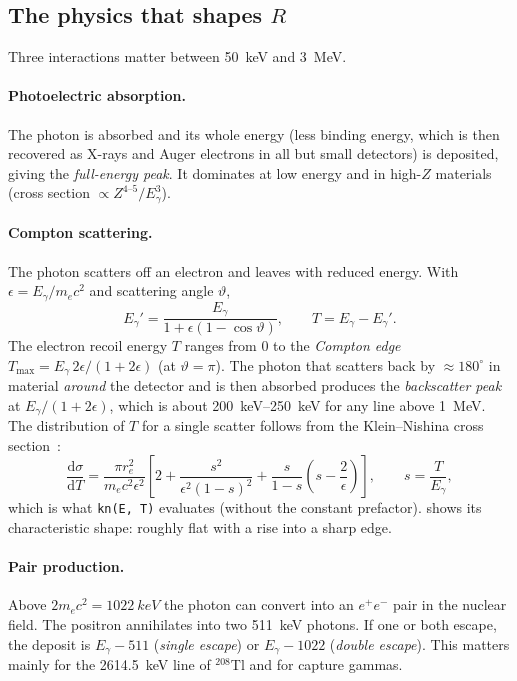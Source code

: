 \documentclass[11pt]{article}
\newcommand{\dd}{\mathrm{d}}
\newcommand{\code}[1]{\texttt{#1}}
\newcommand{\nuc}[2]{${}^{#1}$#2}
\begin{document}
\subsection{The physics that shapes $R$}
Three interactions matter between \SI{50}{keV} and \SI{3}{MeV}.

\paragraph{Photoelectric absorption.} The photon is absorbed and its whole energy (less binding energy, which is then recovered as X-rays and Auger electrons in all but small detectors) is deposited, giving the \emph{full-energy peak}. It dominates at low energy and in high-$Z$ materials (cross section $\propto Z^{4\text{--}5}/E_\gamma^{3}$).

\paragraph{Compton scattering.} The photon scatters off an electron and leaves with reduced energy. With $\epsilon = E_\gamma/m_ec^2$ and scattering angle $\vartheta$,
\begin{equation}
E_\gamma' = \frac{E_\gamma}{1+\epsilon(1-\cos\vartheta)},\qquad T = E_\gamma - E_\gamma'. \label{eq:compton}
\end{equation}
The electron recoil energy $T$ ranges from 0 to the \emph{Compton edge} $T_\text{max} = E_\gamma\,2\epsilon/(1+2\epsilon)$ (at $\vartheta=\pi$). The photon that scatters back by $\approx 180^\circ$ in material \emph{around} the detector and is then absorbed produces the \emph{backscatter peak} at $E_\gamma/(1+2\epsilon)$, which is about \SIrange{200}{250}{keV} for any line above \SI{1}{MeV}. The distribution of $T$ for a single scatter follows from the Klein--Nishina cross section~\cite{KleinNishina}:
\begin{equation}
\frac{\dd\sigma}{\dd T} = \frac{\pi r_e^2}{m_ec^2\epsilon^2}\left[2 + \frac{s^2}{\epsilon^2(1-s)^2} + \frac{s}{1-s}\left(s-\frac{2}{\epsilon}\right)\right],\qquad s = \frac{T}{E_\gamma}, \label{eq:kn}
\end{equation}
which is what \code{kn(E, T)} evaluates (without the constant prefactor).  shows its characteristic shape: roughly flat with a rise into a sharp edge.

\paragraph{Pair production.} Above $2m_ec^2 = \SI{1022}{keV}$ the photon can convert into an $e^+e^-$ pair in the nuclear field. The positron annihilates into two \SI{511}{keV} photons. If one or both escape, the deposit is $E_\gamma - 511$ (\emph{single escape}) or $E_\gamma - 1022$ (\emph{double escape}). This matters mainly for the \SI{2614.5}{keV} line of \nuc{208}{Tl} and for capture gammas.
\end{document}
